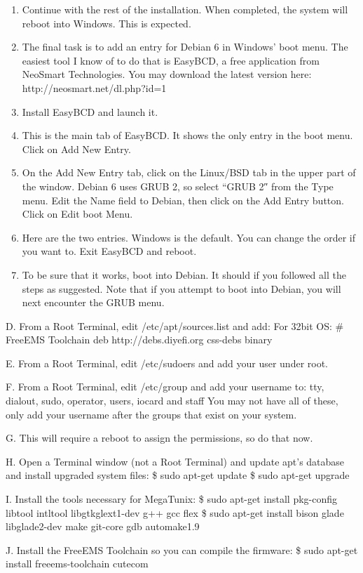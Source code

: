 \documentclass[12pt,notitlepage,onecolumn,oneside,openany,draft]{memoir}
\begin{document}
\begin{enumerate}
\item Continue with the rest of the installation. When completed, the system will reboot into Windows. This is expected. 
\item The final task is to add an entry for Debian 6 in Windows’ boot menu. The easiest tool I know of to do that is EasyBCD, a free application from NeoSmart Technologies. You may download the latest version here: http://neosmart.net/dl.php?id=1 
\item Install EasyBCD and launch it. 
\item This is the main tab of EasyBCD. It shows the only entry in the boot menu. Click on Add New Entry. 
\item On the Add New Entry tab, click on the Linux/BSD tab in the upper part of the window. Debian 6 uses GRUB 2, so select “GRUB 2″ from the Type menu. Edit the Name field to Debian, then click on the Add Entry button. Click on Edit boot Menu. 
\item Here are the two entries. Windows is the default. You can change the order if you want to. Exit EasyBCD and reboot. 
\item To be sure that it works, boot into Debian. It should if you followed all the steps as suggested. Note that if you attempt to boot into Debian, you will next encounter the GRUB menu.
\end{enumerate}

D. From a Root Terminal, edit /etc/apt/sources.list and add:
	For 32bit OS:
# FreeEMS Toolchain
deb http://debs.diyefi.org css-debs binary

E. From a Root Terminal, edit /etc/sudoers and add your user under root.

F. From a Root Terminal, edit /etc/group and add your username to:
tty, dialout, sudo, operator, users, iocard and staff
You may not have all of these, only add your username after the groups that exist on your system.

G. This will require a reboot to assign the permissions, so do that now.

H. Open a Terminal window (not a Root Terminal) and update apt's database and install upgraded system files:
\$ sudo apt-get update
\$ sudo apt-get upgrade

I. Install the tools necessary for MegaTunix:
\$ sudo apt-get install pkg-config libtool intltool libgtkglext1-dev g++ gcc flex 
\$ sudo apt-get install bison glade libglade2-dev make git-core gdb automake1.9

J. Install the FreeEMS Toolchain so you can compile the firmware:
	\$ sudo apt-get install freeems-toolchain cutecom
\end{document}
